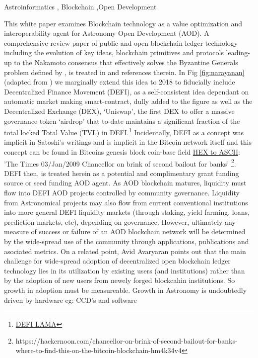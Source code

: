 \documentclass[final,5p,times,twocolumn,authoryear]{elsarticle}
\begin{document}
\begin{frontmatter}



\begin{keyword}
   Astroinformatics \sep 
Blockchain \sep Open Development
\end{keyword}
\end{frontmatter}

This white paper examines Blockchain technology as a value optimization and interoperability agent for Astronomy Open Development (AOD). A comprehensive review paper of public and open blockchain ledger technology including the evolution of key ideas, blockchain primitives and protocols leading-up to the  Nakamoto consensus that effectively solves the Byzantine Generals problem defined by \cite{Lamport1982TheBG}, is treated in  \cite{arvindandclark2017} and references therein. In Fig \ref{fig:narayanan} (adapted from \cite{arvindandclark2017}) we marginally extend this idea to 2018 to fiducially include Decentralized Finance Movement (DEFI), as a self-consistent idea  dependant on automatic market making smart-contract, dully added to the figure as well as the Decentralized Exchange (DEX), `Uniswap', the first DEX to offer a massive governance token `airdrop' that to-date maintains a significant fraction of the total locked Total Value (TVL) in DEFI.\footnote{\href{https://defillama.com/protocols/dexes}{DEFI LAMA}} Incidentally, DEFI as a concept was implicit in Satoshi's writings and is implicit in the Bitcoin network itself and this concept can be found in Bitcoins genesis block \textrm{coin-base field} \href{https://www.blockchain.com/btc/tx/4a5e1e4baab89f3a32518a88c31bc87f618f76673e2cc77ab2127b7afdeda33b}{HEX to ASCII}:  'The Times 03/Jan/2009 Chancellor on brink of second bailout for banks' \footnote{https://hackernoon.com/chancellor-on-brink-of-second-bailout-for-banks-where-to-find-this-on-the-bitcoin-blockchain-hm4k34v4}. DEFI then, is treated herein as a potential and complimentary grant funding source or seed funding AOD agent. As AOD blockchain matures, liquidity must flow into DEFI AOD projects controlled by community governance. Liquidity from Astronomical projects may also flow from current conventional institutions into more general DEFI liquidity markets (through staking, yield farming, loans, prediction markets, etc), depending on governance. However, ultimately any measure of success or failure of an AOD blockchain network will be determined by the wide-spread use of the community through applications, publications and asociated metrics. On a related point, Avid Avaryaran points out that the main challenge for wide-spread adoption of decentralized open blockchain ledger technology lies in its utilization by existing users (and institutions) rather than by the adoption of new users from newely forged blockcahin institutions. So growth in adoption must be measureable. Growth in Astronomy is undoubtedly driven by hardware eg: CCD's and software 
\end{document}
